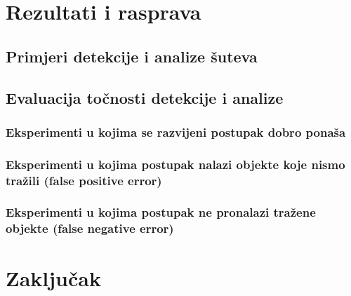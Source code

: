 \documentclass[zavrsnirad]{fer}
\begin{document}
\chapter{Rezultati i rasprava}
\label{pog:rezultati_i_rasprava}

\section{Primjeri detekcije i analize šuteva}
\label{pog:primjeri_detekcije_i_analize_suteva}
\section{Evaluacija točnosti detekcije i analize}
\label{pog:evaluacija_tocnosti_detekcije_i_analize}
\subsection{Eksperimenti u kojima se razvijeni postupak dobro ponaša}
\label{pog:eksperimenti_u_kojima_se_razvijeni_postupak_dobro_ponasa}
\subsection{Eksperimenti u kojima postupak nalazi objekte koje nismo tražili (false positive error)}
\label{pog:eksperimenti_u_kojima_postupak_nalazi_objekte_koje_nismo_trazili}

\subsection{Eksperimenti u kojima postupak ne pronalazi tražene objekte (false negative error)}
\label{pog:eksperimenti_u_kojima_postupak_ne_pronalazi_trazene_objekte}


\chapter{Zaključak}
\label{pog:zakljucak}

\blindtext




\end{document}
